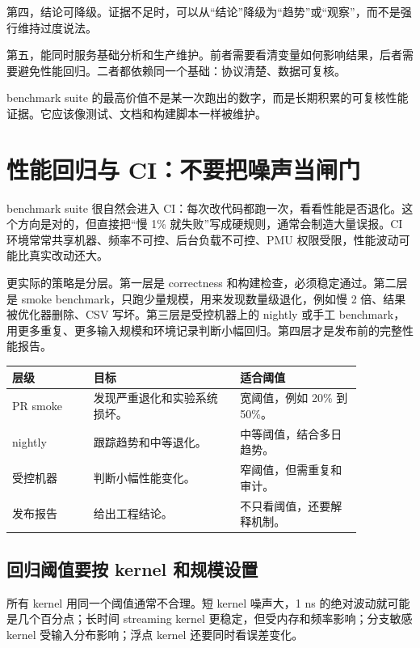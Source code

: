 第四，结论可降级。证据不足时，可以从“结论”降级为“趋势”或“观察”，而不是强行维持过度说法。

第五，能同时服务基础分析和生产维护。前者需要看清变量如何影响结果，后者需要避免性能回归。二者都依赖同一个基础：协议清楚、数据可复核。

\begin{keyidea}
benchmark suite 的最高价值不是某一次跑出的数字，而是长期积累的可复核性能证据。它应该像测试、文档和构建脚本一样被维护。
\end{keyidea}

\section{性能回归与 CI：不要把噪声当闸门}

benchmark suite 很自然会进入 CI：每次改代码都跑一次，看看性能是否退化。这个方向是对的，但直接把“慢 1\% 就失败”写成硬规则，通常会制造大量误报。CI 环境常常共享机器、频率不可控、后台负载不可控、PMU 权限受限，性能波动可能比真实改动还大。

更实际的策略是分层。第一层是 correctness 和构建检查，必须稳定通过。第二层是 smoke benchmark，只跑少量规模，用来发现数量级退化，例如慢 2 倍、结果被优化器删除、CSV 写坏。第三层是受控机器上的 nightly 或手工 benchmark，用更多重复、更多输入规模和环境记录判断小幅回归。第四层才是发布前的完整性能报告。

\begin{center}
\begin{tabular}{p{0.20\linewidth}p{0.36\linewidth}p{0.30\linewidth}}
\toprule
层级 & 目标 & 适合阈值 \\
\midrule
PR smoke & 发现严重退化和实验系统损坏。 & 宽阈值，例如 20\% 到 50\%。 \\
nightly & 跟踪趋势和中等退化。 & 中等阈值，结合多日趋势。 \\
受控机器 & 判断小幅性能变化。 & 窄阈值，但需重复和审计。 \\
发布报告 & 给出工程结论。 & 不只看阈值，还要解释机制。 \\
\bottomrule
\end{tabular}
\end{center}

\subsection{回归阈值要按 kernel 和规模设置}

所有 kernel 用同一个阈值通常不合理。短 kernel 噪声大，1 ns 的绝对波动就可能是几个百分点；长时间 streaming kernel 更稳定，但受内存和频率影响；分支敏感 kernel 受输入分布影响；浮点 kernel 还要同时看误差变化。

